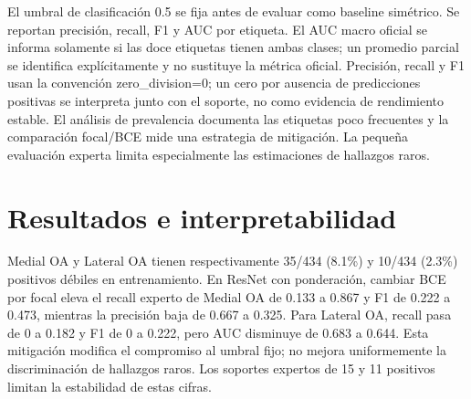 El umbral de clasificación 0.5 se fija antes de evaluar como baseline simétrico.
Se reportan precisión, recall, F1 y AUC por etiqueta.
El AUC macro oficial se informa solamente si las doce etiquetas tienen ambas clases;
un promedio parcial se identifica explícitamente y no sustituye la métrica oficial.
Precisión, recall y F1 usan la convención zero\_division=0; un cero por ausencia de predicciones
positivas se interpreta junto con el soporte, no como evidencia de rendimiento estable.
El análisis de prevalencia documenta las etiquetas poco frecuentes y la comparación focal/BCE mide
una estrategia de mitigación. La pequeña evaluación experta limita especialmente las estimaciones de hallazgos raros.

\section{Resultados e interpretabilidad}


Medial OA y Lateral OA tienen respectivamente 35/434 (8.1\%) y 10/434 (2.3\%) positivos débiles
en entrenamiento. En ResNet con ponderación, cambiar BCE por focal eleva el recall experto de
Medial OA de 0.133 a 0.867 y F1 de 0.222 a 0.473, mientras la precisión baja de 0.667 a 0.325.
Para Lateral OA, recall pasa de 0 a 0.182 y F1 de 0 a 0.222, pero AUC disminuye de 0.683 a 0.644.
Esta mitigación modifica el compromiso al umbral fijo; no mejora uniformemente la discriminación
de hallazgos raros. Los soportes expertos de 15 y 11 positivos limitan la estabilidad de estas cifras.

